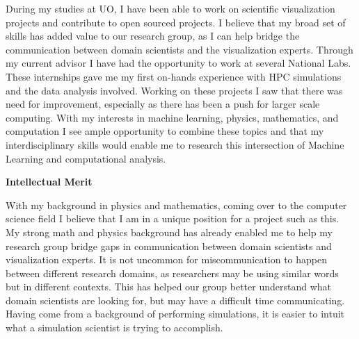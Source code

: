 \documentclass[12pt]{article}
\begin{document}
During my studies at UO, I have been able to work on scientific visualization
projects and contribute to open sourced projects. I believe that my broad set of
skills has added value to our research group, as I can help bridge the
communication between domain scientists and the visualization experts. Through
my current advisor I have had the opportunity to work at several National Labs.
These internships gave me my first on-hands experience with HPC simulations and
the data analysis involved. Working on these projects I saw that there was need
for improvement, especially as there has been a push for larger scale computing.
With my interests in machine learning, physics, mathematics, and computation I
see ample opportunity to combine these topics and that my interdisciplinary
skills would enable me to research this intersection of Machine Learning and
computational analysis.

\textbf{Intellectual Merit}
%

With my background in physics and mathematics, coming over to the computer
science field I believe that I am in a unique position for a project such as
this. My strong math and physics background has already enabled me to help my
research group bridge gaps in communication between domain scientists and
visualization experts. It is not uncommon for miscommunication to happen between
different research domains, as researchers may be using similar words but in
different contexts. This has helped our group better understand what domain
scientists are looking for, but may have a difficult time communicating. Having
come from a background of performing simulations, it is easier to intuit what a
simulation scientist is trying to accomplish.
\end{document}
